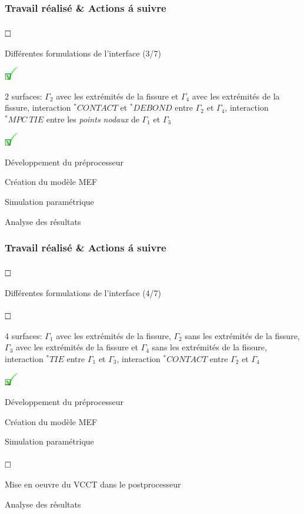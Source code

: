 \documentclass[first,firstsupp,lastsupp,handout,last,hyperref,table]{ETHclass}
\begin{document}
\begin{frame}
\frametitle{Travail r\'ealis\'e \& Actions \'a suivre}
\vspace{-0.5cm}
\scriptsize
\begin{list}{$\text{\rlap{\textcolor{white}{\huge$\mathbf{\checkmark}$}}}\square$}{}  
\item Diff\'erentes formulations de l'interface (3/7)
\begin{list}{$\text{\rlap{\textcolor{green}{\huge$\mathbf{\checkmark}$}}}\square$}{}  
\item 2 surfaces: $\Gamma_{2}$ avec les extr\'emit\'es de la fissure et $\Gamma_{4}$ avec les extr\'emit\'es de la fissure, interaction $^{*}CONTACT$ et $^{*}DEBOND$ entre  $\Gamma_{2}$ et $\Gamma_{4}$, interaction $^{*}MPC\ TIE$ entre les \textit{points nodaux} de $\Gamma_{1}$ et $\Gamma_{3}$
\begin{list}{$\text{\rlap{\textcolor{green}{\huge$\mathbf{\checkmark}$}}}\square$}{}
\item D\'eveloppement du pr\'eprocesseur
\item Cr\'eation du mod\`ele MEF
\item Simulation param\'etrique
\item Analyse des r\'esultats
\end{list}
\end{list}
\end{list}
\end{frame}

\begin{frame}
\frametitle{Travail r\'ealis\'e \& Actions \'a suivre}
\vspace{-0.5cm}
\scriptsize
\begin{list}{$\text{\rlap{\textcolor{white}{\huge$\mathbf{\checkmark}$}}}\square$}{}  
\item Diff\'erentes formulations de l'interface (4/7)
\begin{list}{$\text{\rlap{\textcolor{white}{\huge$\mathbf{\checkmark}$}}}\square$}{}  
\item  4 surfaces: $\Gamma_{1}$ avec les extr\'emit\'es de la fissure, $\Gamma_{2}$ sans les extr\'emit\'es de la fissure, $\Gamma_{3}$ avec les extr\'emit\'es de la fissure et $\Gamma_{4}$ sans les extr\'emit\'es de la fissure, interaction $^{*}TIE$ entre  $\Gamma_{1}$ et $\Gamma_{3}$, interaction $^{*}CONTACT$ entre  $\Gamma_{2}$ et $\Gamma_{4}$
\begin{list}{$\text{\rlap{\textcolor{green}{\huge$\mathbf{\checkmark}$}}}\square$}{}
\item D\'eveloppement du pr\'eprocesseur
\item Cr\'eation du mod\`ele MEF
\item Simulation param\'etrique
\end{list}
\begin{list}{$\text{\rlap{\textcolor{white}{\huge$\mathbf{\checkmark}$}}}\square$}{}  
\item Mise en oeuvre du VCCT dans le postprocesseur
\item Analyse des r\'esultats
\end{list}
\end{list}
\end{list}
\end{frame}
\end{document}
